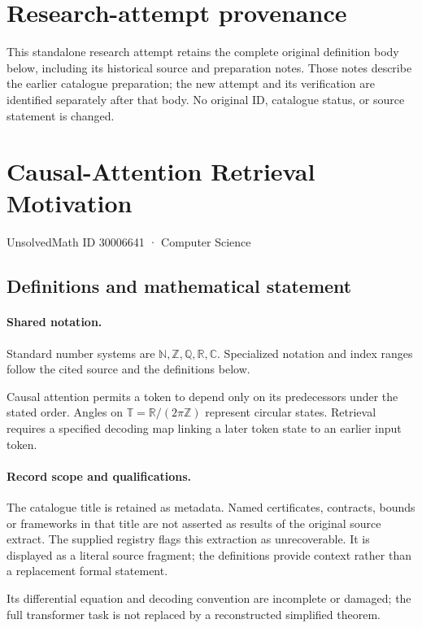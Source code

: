 \documentclass[11pt]{article}
\begin{document}
\section*{Research-attempt provenance}
This standalone research attempt retains the complete original definition body below,
including its historical source and preparation notes. Those notes describe the
earlier catalogue preparation; the new attempt and its verification are identified
separately after that body. No original ID, catalogue status, or source statement is changed.

\section{Causal-Attention Retrieval Motivation}\label{30006641}
{\small UnsolvedMath ID 30006641 · Computer Science}
\subsection{Definitions and mathematical statement}

\paragraph{Shared notation.}Standard number systems are $\mathbb N,\mathbb Z,\mathbb Q,\mathbb R,\mathbb C$. Specialized notation and index ranges follow the cited source and the definitions below.


Causal attention permits a token to depend only on its predecessors under the stated order. Angles on $\mathbb T=\mathbb R/(2\pi\mathbb Z)$ represent circular states. Retrieval requires a specified decoding map linking a later token state to an earlier input token.
\paragraph{Record scope and qualifications.}
The catalogue title is retained as metadata. Named certificates, contracts, bounds or frameworks in that title are not asserted as results of the original source extract.
The supplied registry flags this extraction as unrecoverable. It is displayed as a literal source fragment; the definitions provide context rather than a replacement formal statement.

Its differential equation and decoding convention are incomplete or damaged; the full transformer task is not replaced by a reconstructed simplified theorem.
\end{document}
